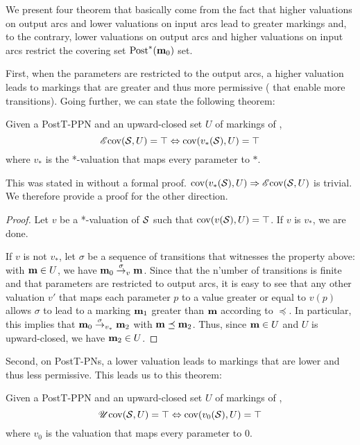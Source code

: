 We present four theorem that basically come from the fact that
higher valuations on output arcs and lower valuations on input arcs lead to greater markings and, to the contrary,
lower valuations on output arcs and higher valuations on input arcs restrict the covering set $\operatorname{Post}^*(\mathbf{m}_0)$ set.

First, when the parameters are restricted to the output arcs, a higher valuation leads to markings that are greater and thus more permissive ( that enable more transitions).
Going further, we can state the following theorem:
\begin{theo}
  \label{theo:post-star-val}
  Given a PostT-\ac{PPN} \SPTPm and an upward-closed set $U$ of markings of \PPN, \[\operatorname{\mathscr{E}cov}(\mathcal{S}, U) = \top \Leftrightarrow \operatorname{cov}(v_*(\mathcal{S}), U) = \top\] where $v_*$ is the *-valuation that maps every parameter to $*$.
\end{theo}

This was stated in \cite{David17} without a formal proof.
$\operatorname{cov}(v_*(\mathcal{S}), U) \Rightarrow \operatorname{\mathscr{E}cov}(\mathcal{S}, U)$ is trivial.
We therefore provide a proof for the other direction.


\begin{proof}
  Let $v$ be a *-valuation of $\mathcal{S}$ such that $\operatorname{cov}(v(\mathcal{S}), U) = \top$.
  If $v$ is $v_*$, we are done.

  If $v$ is not $v_*$, let $\sigma$ be a sequence of transitions that witnesses the property above: with $\mathbf{m} \in U$, we have $\mathbf{m}_0 \stackrel{\sigma}{\to}_v \mathbf{m}$.
  Since that the n'umber of transitions is finite and that parameters are restricted to output arcs, it is easy to see that any other valuation $v'$ that maps each parameter $p$ to a value greater or equal to $v(p)$ allows $\sigma$ to lead to a marking $\mathbf{m}_1$ greater than $\mathbf{m}$ according to $\preceq$.
  In particular, this implies that $\mathbf{m}_0 \stackrel{\sigma}{\to}_{v_*} \mathbf{m}_2$ with $\mathbf{m} \preceq \mathbf{m}_2$.
  Thus, since $\mathbf{m} \in U$ and $U$ is upward-closed, we have $\mathbf{m}_2 \in U$.
\end{proof}

Second, on PostT-\acp{PN}, a lower valuation leads to markings that are lower and thus less permissive.
This leads us to this theorem:
\begin{theo}
  \label{theo:post-zero-val}
  Given a PostT-\ac{PPN} \SPTPm and an upward-closed set $U$ of markings of \PPN, \[\operatorname{\mathscr{U}cov}(\mathcal{S}, U) = \top \Leftrightarrow \operatorname{cov}(v_0(\mathcal{S}), U) = \top\] where $v_0$ is the valuation that maps every parameter to $0$.
\end{theo}

